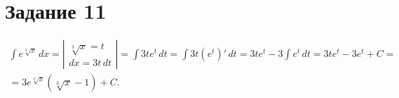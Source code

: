 \section{Задание 11}

\begin{multline*}
    \int e^{\sqrt[3]{x}} \, dx = \left|\begin{array}{l}
        \sqrt[3]{x} = t \\
        dx = 3t \, dt
    \end{array}\right| = 
    \int 3t e^t \, dt = \int 3t (e^t)' \, dt = 
    3t e^t - 3 \int e^t \, dt = 3t e^t - 3e^t + C =\\ = 
    3e^{\sqrt[3]{x}} (\sqrt[3]{x} - 1) + C.
\end{multline*}

